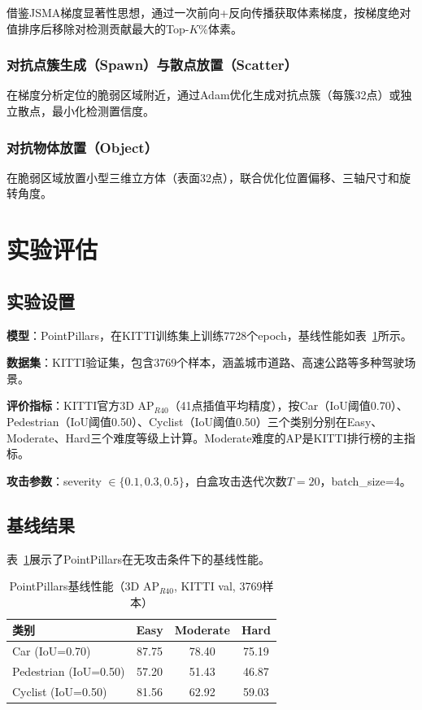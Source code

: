 ﻿\documentclass[12pt,a4paper]{ctexart}
\begin{document}
借鉴JSMA梯度显著性思想，通过一次前向+反向传播获取体素梯度，按梯度绝对值排序后移除对检测贡献最大的Top-$K$\%体素。

\subsubsection{对抗点簇生成（Spawn）与散点放置（Scatter）}

在梯度分析定位的脆弱区域附近，通过Adam优化生成对抗点簇（每簇32点）或独立散点，最小化检测置信度。

\subsubsection{对抗物体放置（Object）}

在脆弱区域放置小型三维立方体（表面32点），联合优化位置偏移、三轴尺寸和旋转角度。

\section{实验评估}

\subsection{实验设置}

\textbf{模型}：PointPillars\cite{lang2019pointpillars}，在KITTI训练集上训练7728个epoch，基线性能如表~\ref{tab:baseline}所示。

\textbf{数据集}：KITTI验证集\cite{geiger2012kitti}，包含3769个样本，涵盖城市道路、高速公路等多种驾驶场景。

\textbf{评价指标}：KITTI官方3D AP$_{R40}$（41点插值平均精度），按Car（IoU阈值0.70）、Pedestrian（IoU阈值0.50）、Cyclist（IoU阈值0.50）三个类别分别在Easy、Moderate、Hard三个难度等级上计算。Moderate难度的AP是KITTI排行榜的主指标。

\textbf{攻击参数}：severity $\in \{0.1, 0.3, 0.5\}$，白盒攻击迭代次数$T=20$，batch\_size=4。

\subsection{基线结果}

表~\ref{tab:baseline}展示了PointPillars在无攻击条件下的基线性能。

\begin{table}[H]
\centering
\caption{PointPillars基线性能（3D AP$_{R40}$, KITTI val, 3769样本）}
\label{tab:baseline}
\begin{tabular}{lccc}
\toprule
\textbf{类别} & \textbf{Easy} & \textbf{Moderate} & \textbf{Hard} \\
\midrule
Car (IoU=0.70) & 87.75 & 78.40 & 75.19 \\
Pedestrian (IoU=0.50) & 57.20 & 51.43 & 46.87 \\
Cyclist (IoU=0.50) & 81.56 & 62.92 & 59.03 \\
\bottomrule
\end{tabular}
\end{table}
\end{document}
